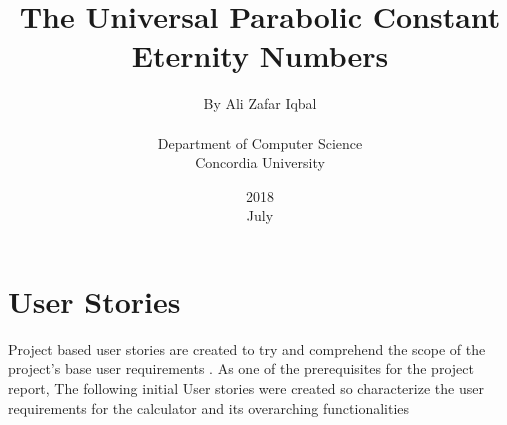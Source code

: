 \documentclass[12pt]{report}
\title{The Universal Parabolic Constant\\ \textbf{Eternity Numbers}}
\date{2018\\ July}
\author{By Ali Zafar Iqbal\\\\ Department of Computer Science \\Concordia University }
\date{}
\begin{document}
 
\maketitle 


\baselineskip20pt


\tableofcontents
\graphicspath{ {./Universal Parabolic Constant Mindmap/}{./images2/} }



\newpage




 


\chapter{User Stories}
    
   Project based user stories are created to try and comprehend the scope of the project's  base user requirements .  As one of the prerequisites for the project report,  The following initial User stories were created so characterize the user requirements for the calculator and its overarching functionalities 
\end{document}
